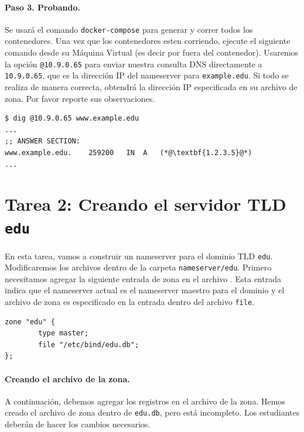 \paragraph{Paso 3. Probando.} Se usará el comando \texttt{docker-compose} para generar y correr todos los contenedores. 
Una vez que los contenedores esten corriendo, ejecute el siguiente comando desde su Máquina Virtual (es decir por fuera del contenedor). Usaremos la opción  \texttt{@10.9.0.65} para enviar nuestra consulta DNS directamente a  \texttt{10.9.0.65}, que es la dirección IP del nameserver para \texttt{example.edu}. Si todo se realiza de manera correcta, obtendrá la dirección IP especificada en su archivo de zona. Por favor reporte sus observaciones.

\begin{lstlisting}
$ dig @10.9.0.65 www.example.edu
... 
;; ANSWER SECTION:
www.example.edu.    259200   IN  A   (*@\textbf{1.2.3.5}@*)
...
\end{lstlisting}





\section{Tarea 2: Creando el servidor TLD \texttt{edu}}

En esta tarea, vamos a construir un nameserver para el dominio TLD \texttt{edu}.
Modificaremos los archivos dentro de la carpeta  \texttt{nameserver/edu}.
Primero necesitamos agregar la siguiente entrada de zona en el archivo . Esta entrada indica que el nameserver actual es el nameserver maestro para el dominio y el archivo de zona es especificado en la entrada dentro del archivo \texttt{file}.


\begin{lstlisting}
zone "edu" {
        type master;
        file "/etc/bind/edu.db";
};
\end{lstlisting}


\paragraph{Creando el archivo de la zona.} A continuación, debemos agregar los registros en el archivo de la zona. Hemos creado el archivo de zona dentro de \texttt{edu.db}, pero está incompleto. Los estudiantes deberán de hacer los cambios necesarios.

